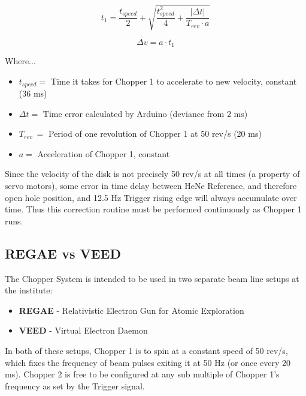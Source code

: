 \documentclass{article}
\begin{document}
        \begin{equation}
            t_1 = \frac{t_{speed}}{2} + \sqrt{\frac{t_{speed}^2}{4} + \frac{|\Delta t|}{T_{rev}\cdot a}}
        \end{equation}
        
        \begin{equation}
            \Delta v = a \cdot t_1
        \end{equation}
        
        Where...
        
        \begin{itemize}
            \item $t_{speed} = $ Time it takes for Chopper 1 to accelerate to new velocity, constant (36 ms)
            \item $\Delta t = $ Time error calculated by Arduino (deviance from 2 ms)
            \item $T_{rev} \ = $ Period of one revolution of Chopper 1 at 50 rev/s (20 ms)
            \item $a = $ Acceleration of Chopper 1, constant
        \end{itemize}
        
        Since the velocity of the disk is not precisely 50 rev/s at all times (a property of servo motors), some error in time delay between HeNe Reference, and therefore open hole position, and 12.5 Hz Trigger rising edge will always accumulate over time. Thus this correction routine must be performed continuously as Chopper 1 runs.
    
    \subsection{REGAE vs VEED} \label{chopper_regae_veed}
    
    The Chopper System is intended to be used in two separate beam line setups at the institute:
    
    \begin{itemize}
        \item \textbf{REGAE} - Relativistic Electron Gun for Atomic Exploration
        \item \textbf{VEED} - Virtual Electron Daemon
    \end{itemize}
    
    In both of these setups,  Chopper 1 is to spin at a constant speed of 50 rev/s, which fixes the frequency of beam pulses exiting it at 50 Hz (or once every 20 ms). Chopper 2 is free to be configured at any sub multiple of Chopper 1's frequency as set by the Trigger signal.
    
\end{document}
